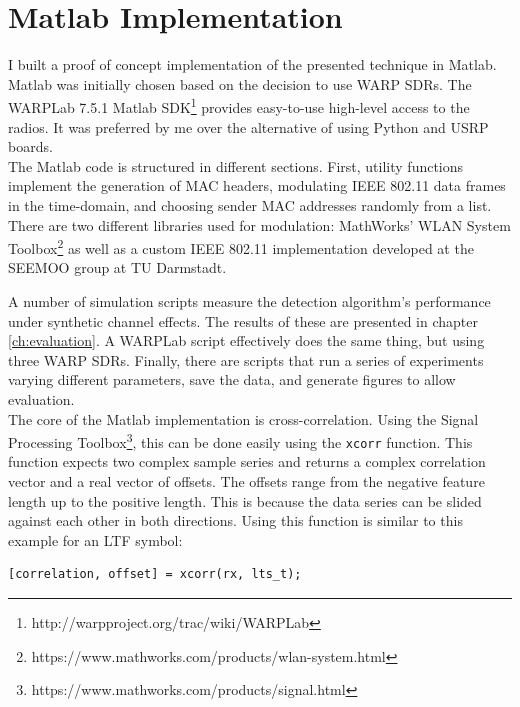 
\section{Matlab Implementation}\label{sec:matlab-impl}

I built a proof of concept implementation of the presented technique in Matlab. Matlab was initially chosen based on the decision to use \gls{WARP} \glspl{SDR}. The WARPLab 7.5.1 Matlab \gls{SDK}\footnote{http://warpproject.org/trac/wiki/WARPLab} provides easy-to-use high-level access to the radios. It was preferred by me over the alternative of using Python and \gls{USRP} boards.\\

The Matlab code is structured in different sections. First, utility functions implement the generation of \gls{MAC} headers, modulating IEEE 802.11 data frames in the time-domain, and choosing sender \gls{MAC} addresses randomly from a list. There are two different libraries used for modulation: MathWorks' WLAN System Toolbox\footnote{https://www.mathworks.com/products/wlan-system.html} as well as a custom IEEE 802.11 implementation developed at the \gls{SEEMOO} group at TU Darmstadt.

A number of simulation scripts measure the detection algorithm's performance under synthetic channel effects. The results of these are presented in chapter \ref{ch:evaluation}. A WARPLab script effectively does the same thing, but using three \gls{WARP} \glspl{SDR}. Finally, there are scripts that run a series of experiments varying different parameters, save the data, and generate figures to allow evaluation.\\

The core of the Matlab implementation is cross-correlation. Using the Signal Processing Toolbox\footnote{https://www.mathworks.com/products/signal.html}, this can be done easily using the \texttt{xcorr} function. This function expects two complex sample series and returns a complex correlation vector and a real vector of offsets. The offsets range from the negative feature length up to the positive length. This is because the data series can be slided against each other in both directions. Using this function is similar to this example for an \gls{LTF} symbol:\\

\begin{lstlisting}[captionpos=b,caption={Cross-Correlation of an LTF Symbol},label=lst:xcorr]
[correlation, offset] = xcorr(rx, lts_t);
\end{lstlisting}


